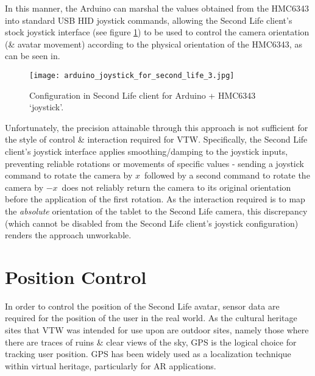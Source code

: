 
In this manner, the Arduino can marshal the values obtained from the HMC6343 into standard USB HID joystick commands, allowing the Second Life client's stock joystick interface (see figure \ref{arduino_joystick_for_second_life_3.jpg}) to be used to control the camera orientation (\& avatar movement) according to the physical orientation of the HMC6343, as can be seen in\ArduinoJoystickVideoFootnote{}.

\begin{figure}[h]
\centering
  \texttt{[image: arduino\_joystick\_for\_second\_life\_3.jpg]}
  \caption{Configuration in Second Life client for Arduino + HMC6343 `joystick'.}
  \label{arduino_joystick_for_second_life_3.jpg}
\end{figure}

Unfortunately, the precision attainable through this approach is not sufficient for the style of control \& interaction required for VTW. Specifically, the Second Life client's joystick interface applies smoothing/damping to the joystick inputs, preventing reliable rotations or movements of specific values - sending a joystick command to rotate the camera by $x$\textdegree\ followed by a second command to rotate the camera by $-x$\textdegree\ does not reliably return the camera to its original orientation before the application of the first rotation. As the interaction required is to map the \textit{absolute} orientation of the tablet to the Second Life camera, this discrepancy (which cannot be disabled from the Second Life client's joystick configuration) renders the approach unworkable.


\section{Position Control}
\label{second_life_position_control}

In order to control the position of the Second Life avatar, sensor data are required for the position of the user in the real world. As the cultural heritage sites that VTW was intended for use upon are outdoor sites, namely those where there are traces of ruins \& clear views of the sky, GPS is the logical choice for tracking user position. GPS has been widely used as a localization technique within virtual heritage, particularly for AR applications.

